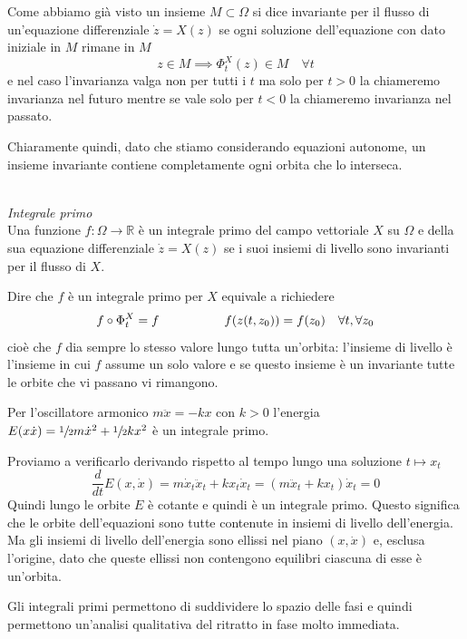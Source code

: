 \documentclass[11pt,a4paper,twoside]{book}
\newenvironment{definizione}[1][\empty]{\begin{Definizione}{
\ifx\empty#1\relax\else\mdseries\itshape#1\\\fi
}{}}{\end{Definizione}}
\newenvironment{esempio}[1][Esempio]{ 
  \begin{center}\begin{tcolorbox}[
  title={#1:\\},
  width=0.9\linewidth,
  flush right,
  enhanced jigsaw, 
  colback=white, 
  frame hidden, 
  sharpish corners, arc=3mm,
  borderline west = {1pt}{0pt}{gray},
  borderline south = {1pt}{0pt}{gray},
  coltitle=black, 
  fonttitle=\small\bfseries, 
  attach title to upper, 
  breakable,
  top=2.5pt, bottom=0.3pt]\small
  }{
 \normalsize \end{tcolorbox}\end{center}
}
\theoremstyle{esss}
\theoremstyle{dotless}
\numberwithin{equation}{section} %
\begin{document}
Come abbiamo già visto un insieme $M\subset\Omega$ si dice invariante per il flusso di un'equazione differenziale $\dot{z}=X(z)$ se ogni soluzione dell'equazione con dato iniziale in $M$ rimane in $M$
\[
z\in M \implies \Phi_t^X(z)\in M \quad \forall t
\]
e nel caso l'invarianza valga non per tutti i $t$ ma solo per $t>0$ la chiameremo invarianza nel futuro mentre se vale solo per $t<0$ la chiameremo invarianza nel passato.

Chiaramente quindi, dato che stiamo considerando equazioni autonome, un insieme invariante contiene completamente ogni orbita che lo interseca.

\begin{definizione}\textit{Integrale primo}\\
Una funzione $f:\Omega\rightarrow\mathbb{R}$ è un integrale primo del campo vettoriale $X$ su $\Omega$ e della sua equazione differenziale $\dot{z}=X(z)$ se i suoi insiemi di livello sono invarianti per il flusso di $X$.
\end{definizione}

Dire che $f$ è un integrale primo per $X$ equivale a richiedere
\[
f\circ\Phi^X_t=f \hspace{0.15\linewidth} f(z(t,z_0))=f(z_0) \quad \forall t , \forall z_0
\]
cioè che $f$ dia sempre lo stesso valore lungo tutta un'orbita: l'insieme di livello è l'insieme in cui $f$ assume un solo valore e se questo insieme è un invariante tutte le orbite che vi passano vi rimangono.

\begin{esempio}
Per l'oscillatore armonico $m\ddot{x}=-k x$ con $k>0$ l'energia $E(x\dot{x})=\sfrac{1}{2} m\dot{x}^2 +\sfrac{1}{2}kx^2$ è un integrale primo.

Proviamo a verificarlo derivando rispetto al tempo lungo una soluzione $t\mapsto x_t$
\[\dfrac{d}{dt}E(x,\dot{x})=m\dot{x}_t\ddot{x}_t+k x_t \dot{x}_t = (m\ddot{x}_t +k x_t )\dot{x}_t =0
\]
Quindi lungo le orbite $E$ è cotante e quindi è un integrale primo. Questo significa che le orbite dell'equazioni sono tutte contenute in insiemi di livello dell'energia. Ma gli insiemi di livello dell'energia sono ellissi nel piano $(x,\dot{x})$ e, esclusa l'origine, dato che queste ellissi non contengono equilibri ciascuna di esse è un'orbita.
\end{esempio}


Gli integrali primi permettono di suddividere lo spazio delle fasi e quindi permettono un'analisi qualitativa del ritratto in fase molto immediata.
\end{document}

